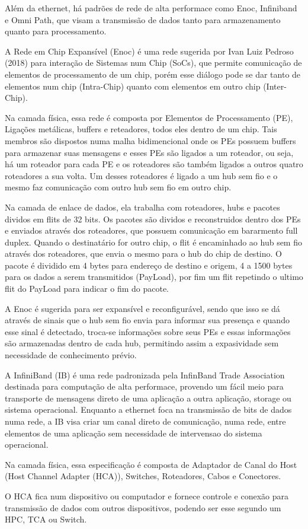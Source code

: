 \documentclass[a4paper,12pt]{article}
\begin{document}
Além da ethernet, há padrões de rede de alta performace como Enoc, Infiniband e Omni Path, que visam a transmissão de dados tanto para armazenamento quanto para processamento.

A Rede em Chip Expansível (Enoc) é uma rede sugerida por Ivan Luiz Pedroso (2018) para interação de Sistemas num Chip (SoCs), que permite comunicação de elementos de processamento de um chip, porém esse diálogo pode se dar tanto de elementos num chip (Intra-Chip) quanto com elementos em outro chip (Inter-Chip).

Na camada física, essa rede é composta por Elementos de Processamento (PE), Ligações metálicas, buffers e reteadores, todos eles dentro de um chip. Tais membros são dispostos numa malha bidimencional onde os PEs possuem buffers para armazenar suas mensagens e esses PEs são ligados a um roteador, ou seja, há um roteador para cada PE e os roteadores são também ligados a outros quatro roteadores a sua volta. Um desses roteadores é ligado a um hub sem fio e o mesmo faz comunicação com outro hub sem fio em outro chip.

Na camada de enlace de dados, ela trabalha com roteadores, hubs e pacotes dividos em flits de 32 bits. Os pacotes são dividos e reconstruidos dentro dos PEs e enviados através dos roteadores, que possuem comunicação em bararmento full duplex. Quando o destinatário for outro chip, o flit é encaminhado ao hub sem fio através dos roteadores, que envia o mesmo para o hub do chip de destino. O pacote é dividido em 4 bytes para endereço de destino e origem, 4 a 1500 bytes para os dados a serem transmitidos (PayLoad), por fim um flit repetindo o ultimo flit do PayLoad para indicar o fim do pacote.

A Enoc é sugerida para ser expansível e reconfigurável, sendo que isso se dá através de sinais que o hub sem fio envia para informar sua presença e quando esse sinal é detectado, troca-se informações sobre seus PEs e essas informações são armazenadas dentro de cada hub, permitindo assim a expasividade sem necessidade de conhecimento prévio.

A InfiniBand (IB) é uma rede padronizada pela InfinBand Trade Association destinada para computação de alta performace, provendo um fácil meio para transporte de mensagens direto de uma aplicação a outra aplicação, storage ou sistema operacional. Enquanto a ethernet foca na transmissão de bits de dados numa rede, a IB visa criar um canal direto de comunicação, numa rede, entre elementos de uma aplicação sem necessidade de intervensao do sistema operacional.

Na camada física, essa especificação é composta de Adaptador de Canal do Host (Host Channel Adapter (HCA)), Switches, Roteadores, Cabos e Conectores.

O HCA fica num dispositivo ou computador e fornece controle e conexão para transmissão de dados com outros dispositivos, podendo ser esse segundo um HPC, TCA ou Switch.
\end{document}

